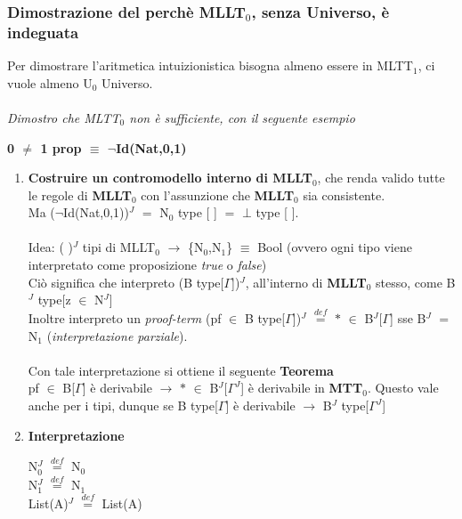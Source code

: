 \subsubsection{Dimostrazione del perch\`e MLLT$_0$, senza Universo, \`e indeguata}
\label{subsec:dimostro-perch\`e-MLLT$_0$-senza-Universo-\`e-indeguata}
Per dimostrare l'aritmetica intuizionistica bisogna almeno essere in MLTT$_1$, ci vuole almeno U$_0$ Universo.\\\\
\textit{Dimostro che MLTT$_0$ non \`e sufficiente, con il seguente esempio}
\begin{center}
\textbf{0 $\neq$ 1 prop $\equiv$ $\neg$Id(Nat,0,1)}
\end{center}
\noindent
\begin{enumerate}
\item \textbf{Costruire un contromodello interno di MLLT$_0$}, che renda valido tutte le regole di \textbf{MLLT$_0$} con l'assunzione che \textbf{MLLT$_0$} sia consistente.\\
Ma ($\neg$Id(Nat,0,1))$^J$ $=$ N$_0$ type [ ] $=$ $\bot$ type [ ].\\\\
\noindent
Idea: ( )$^J$ tipi di MLLT$_0$ $\rightarrow$ \{N$_0$,N$_1$\} $\equiv$ Bool (ovvero ogni tipo viene interpretato come proposizione \textit{true} o \textit{false})\\
Ci\`o significa che interpreto (B type[$\Gamma$])$^J$, all'interno di \textbf{MLLT$_0$} stesso, come B$^J$ type[z $\in$ N$^J$]\\
Inoltre interpreto un \textit{proof-term} (pf $\in$ B type[$\Gamma$])$^J$ ${\overset{\mathit{def}}{=}}$ $\ast$ $\in$ B$^J$[$\Gamma$] sse B$^J$ $=$ N$_1$ (\textit{interpretazione parziale}).\\\\
\noindent
Con tale interpretazione si ottiene il seguente \textbf{Teorema}\\
pf $\in$ B[$\Gamma$] \`e derivabile $\rightarrow$ $\ast$ $\in$ B$^J$[$\Gamma^J$] \`e derivabile in \textbf{MTT$_0$}. Questo vale anche per i tipi, dunque se B type[$\Gamma$] \`e derivabile $\rightarrow$ B$^J$ type[$\Gamma^J$]
\item \textbf{Interpretazione}
\begin{center}
N$_0^J$ ${\overset{\mathit{def}}{=}}$ N$_0$\\
N$_1^J$ ${\overset{\mathit{def}}{=}}$ N$_1$\\
List(A)$^J$ ${\overset{\mathit{def}}{=}}$ List(A)\\

\end{center}
\end{enumerate}
